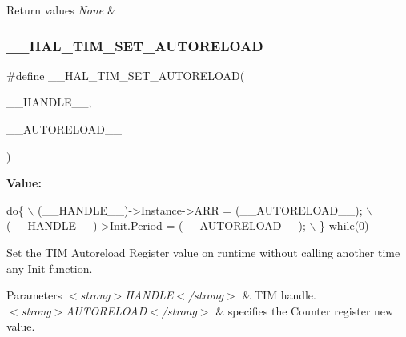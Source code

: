 \begin{DoxyRetVals}{Return values}
{\em None} & \\
\hline
\end{DoxyRetVals}
\mbox{\label{group___t_i_m___exported___macros_ga1e6300cab1e34ecaaf490dc7d4812d69}} 
\subsubsection{\texorpdfstring{\+\_\+\+\_\+\+H\+A\+L\+\_\+\+T\+I\+M\+\_\+\+S\+E\+T\+\_\+\+A\+U\+T\+O\+R\+E\+L\+O\+AD}{\_\_HAL\_TIM\_SET\_AUTORELOAD}}
{\footnotesize\ttfamily \#define \+\_\+\+\_\+\+H\+A\+L\+\_\+\+T\+I\+M\+\_\+\+S\+E\+T\+\_\+\+A\+U\+T\+O\+R\+E\+L\+O\+AD(\begin{DoxyParamCaption}\item[{}]{\+\_\+\+\_\+\+H\+A\+N\+D\+L\+E\+\_\+\+\_\+,  }\item[{}]{\+\_\+\+\_\+\+A\+U\+T\+O\+R\+E\+L\+O\+A\+D\+\_\+\+\_\+ }\end{DoxyParamCaption})}

{\bfseries Value\+:}
\begin{DoxyCode}
\textcolor{keywordflow}{do}\{                                                    \(\backslash\)
                              (\_\_HANDLE\_\_)->Instance->ARR = (\_\_AUTORELOAD\_\_);  \(\backslash\)
                              (\_\_HANDLE\_\_)->Init.Period = (\_\_AUTORELOAD\_\_);    \(\backslash\)
                          \} \textcolor{keywordflow}{while}(0)
\end{DoxyCode}


Set the T\+IM Autoreload Register value on runtime without calling another time any Init function. 


\begin{DoxyParams}{Parameters}
{\em $<$strong$>$\+H\+A\+N\+D\+L\+E$<$/strong$>$} & T\+IM handle. \\
\hline
{\em $<$strong$>$\+A\+U\+T\+O\+R\+E\+L\+O\+A\+D$<$/strong$>$} & specifies the Counter register new value. \\
\hline
\end{DoxyParams}

